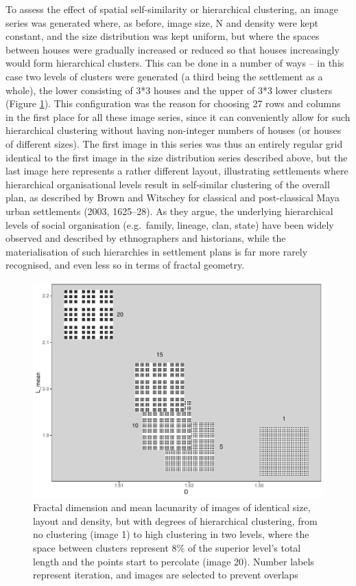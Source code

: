 \documentclass[
  12pt,
  a4paper, twoside]{book}
\begin{document}
To assess the effect of spatial self-similarity or hierarchical clustering, an image series was generated where, as before, image size, N and density were kept constant, and the size distribution was kept uniform, but where the spaces between houses were gradually increased or reduced so that houses increasingly would form hierarchical clusters. This can be done in a number of ways -- in this case two levels of clusters were generated (a third being the settlement as a whole), the lower consisting of 3*3 houses and the upper of 3*3 lower clusters (Figure \ref{fig:08-clustering-im}). This configuration was the reason for choosing 27 rows and columns in the first place for all these image series, since it can conveniently allow for such hierarchical clustering without having non-integer numbers of houses (or houses of different sizes). The first image in this series was thus an entirely regular grid identical to the first image in the size distribution series described above, but the last image here represents a rather different layout, illustrating settlements where hierarchical organisational levels result in self-similar clustering of the overall plan, as described by Brown and Witschey for classical and post-classical Maya urban settlements (2003, 1625--28). As they argue, the underlying hierarchical levels of social organisation (e.g.~family, lineage, clan, state) have been widely observed and described by ethnographers and historians, while the materialisation of such hierarchies in settlement plans is far more rarely recognised, and even less so in terms of fractal geometry.



\begin{figure}

{\centering \includegraphics[width=0.9\linewidth]{Results/fig08_clustering_im} 

}

\caption[Effect of hierarchical clustering on D and L]{Fractal dimension and mean lacunarity of images of identical size, layout and density, but with degrees of hierarchical clustering, from no clustering (image 1) to high clustering in two levels, where the space between clusters represent 8\% of the superior level's total length and the points start to percolate (image 20). Number labels represent iteration, and images are selected to prevent overlaps}\label{fig:08-clustering-im}
\end{figure}
\end{document}
